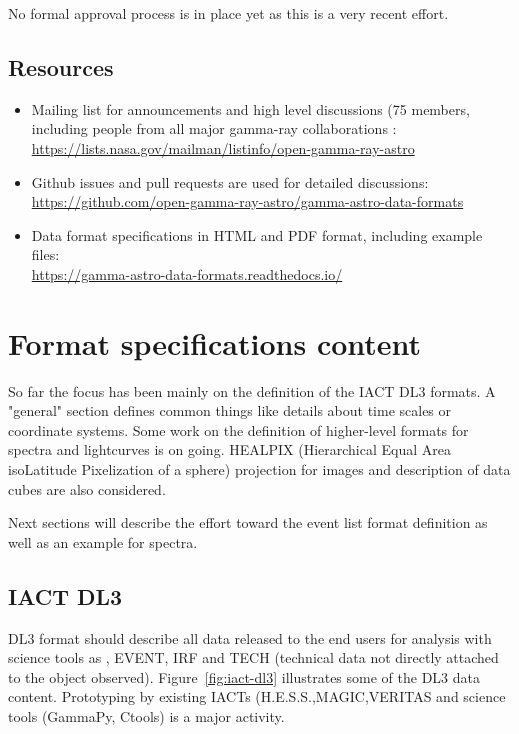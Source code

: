 No formal approval process is in place yet as this is a very recent effort.

\subsection{Resources}

\begin{itemize}
\item{} Mailing list for announcements and high level discussions (75 members, including people from all major gamma-ray collaborations :\\ \url{https://lists.nasa.gov/mailman/listinfo/open-gamma-ray-astro}
\item{}Github issues and pull requests are used for detailed discussions:\\ \url{https://github.com/open-gamma-ray-astro/gamma-astro-data-formats}
\item{}Data format specifications in HTML and PDF format, including example files:\\ \url{https://gamma-astro-data-formats.readthedocs.io/}
\end{itemize}

\section{Format specifications content}

So far the focus has been mainly on the definition of the IACT DL3 formats.  A "general" section defines common things like details about time scales or coordinate systems. Some work on the definition of higher-level formats for spectra and lightcurves is on going. HEALPIX  (Hierarchical Equal Area isoLatitude Pixelization of a sphere) projection for images and  description of data cubes are also considered.

Next sections will describe the effort toward the event list format definition as well as an example for spectra.

\subsection{IACT DL3}

DL3 format should describe all data released to the end users for analysis with science tools as , EVENT, IRF and TECH (technical data not directly attached to the object observed). Figure~\ref{fig:iact-dl3} illustrates some of the DL3 data content. Prototyping by existing IACTs (H.E.S.S.,MAGIC,VERITAS and science tools (GammaPy, Ctools) is a major activity. 

